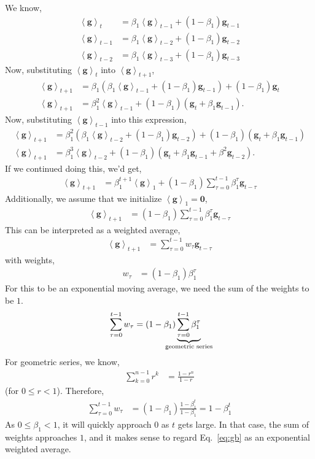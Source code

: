 \documentclass{article}
\newcommand{\bracket}[3]{\left#1 #3 \right#2}
\newcommand{\ab}{\bracket{\langle}{\rangle}}
\newcommand{\0}{\mathbf{0}}
\newcommand{\g}{\mathbf{g}}
\newcommand{\gb}{\mathbf{\ab{g}}}
\begin{document}
We know,
\begin{align}
  \gb_{t} &= \beta_1 \gb_{t-1} + (1-\beta_1) \g_{t-1}\\
  \gb_{t-1} &= \beta_1 \gb_{t-2} + (1-\beta_1) \g_{t-2}\\
  \gb_{t-2} &= \beta_1 \gb_{t-3} + (1-\beta_1) \g_{t-3}
\end{align}
Now, substituting $\gb_t$ into $\gb_{t+1}$,
\begin{align}
  \gb_{t+1} &= \beta_1 (\beta_1 \gb_{t-1} + (1-\beta_1) \g_{t-1}) + (1-\beta_1) \g_t\\
  \gb_{t+1} &= \beta_1^2 \gb_{t-1} + (1-\beta_1) (\g_t + \beta_1 \g_{t-1}).
\end{align}
Now, substituting $\gb_{t-1}$ into this expression,
\begin{align}
  \gb_{t+1} &= \beta_1^2 (\beta_1 \gb_{t-2} + (1-\beta_1) \g_{t-2}) + (1-\beta_1) (\g_t + \beta_1 \g_{t-1})\\
  \gb_{t+1} &= \beta_1^3 \gb_{t-2} + (1-\beta_1) (\g_t + \beta_1 \g_{t-1} + \beta^2 \g_{t-2}).
\end{align}
If we continued doing this, we'd get,
\begin{align}
  \gb_{t+1} &= \beta_1^{t+1} \gb_{1} + (1-\beta_1) \sum_{\tau=0}^{t-1}\beta_1^{\tau} \g_{t-\tau}
\end{align}
Additionally, we assume that we initialize $\gb_1 = \0$,
\begin{align}
  \gb_{t+1} &= (1-\beta_1) \sum_{\tau=0}^{t-1}\beta_1^{\tau} \g_{t-\tau}
\end{align}
This can be interpreted as a weighted average, 
\begin{align}
  \gb_{t+1} &= \sum_{\tau=0}^{t-1}w_\tau \g_{t-\tau}
\end{align}
with weights,
\begin{align}
  w_{\tau} &= (1-\beta_1) \beta_1^{\tau}
\end{align}
For this to be an exponential moving average, we need the sum of the weights to be $1$.
\begin{align}
  \sum_{\tau=0}^{t-1} w_{\tau} &= (1-\beta_1) \underbrace{\sum_{\tau=0}^{t-1} \beta_1^{\tau}}_{\mathclap{\text{geometric series}}}
\end{align}
For geometric series, we know,
\begin{align}
  \sum_{k=0}^{n-1} r^k &= \frac{1-r^n}{1-r}
\end{align}
(for $0 \leq r < 1$).
Therefore,
\begin{align}
  \sum_{\tau=0}^{t-1} w_{\tau} &= (1-\beta_1) \frac{1-\beta_1^t}{1-\beta_1} = 1-\beta_1^t
\end{align}
As $0 \leq \beta_1 < 1$, it will quickly approach $0$ as $t$ gets large. 
In that case, the sum of weights approaches $1$, and it makes sense to regard Eq.~\eqref{eq:gb} as an exponential weighted average.
\end{document}
